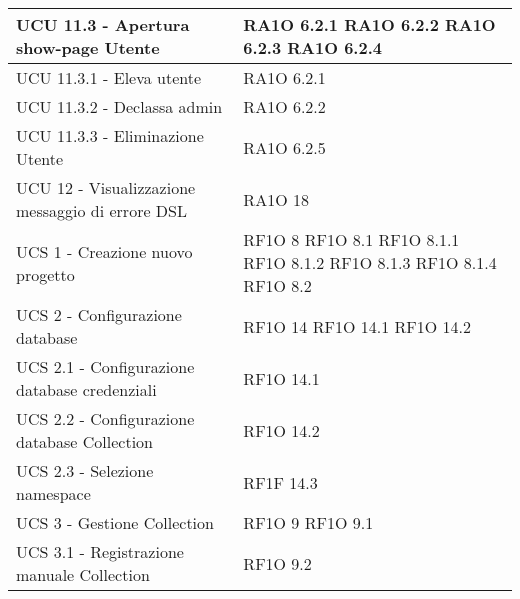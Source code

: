\begin{center}
\begin{longtable}{ | p{5cm} | p{5cm} |}
            UCU 11.3 - Apertura show-page Utente &  RA1O 6.2.1 \newline  RA1O 6.2.2 \newline  RA1O 6.2.3 \newline  RA1O 6.2.4 \newline  \\ \hline      
            UCU 11.3.1 - Eleva utente &  RA1O 6.2.1 \newline  \\ \hline      
            UCU 11.3.2 - Declassa admin &  RA1O 6.2.2 \newline  \\ \hline      
            UCU 11.3.3 - Eliminazione Utente &  RA1O 6.2.5 \newline  \\ \hline      
            UCU 12 - Visualizzazione messaggio di errore DSL &  RA1O 18 \newline  \\ \hline      
            UCS 1 - Creazione nuovo progetto &  RF1O 8 \newline  RF1O 8.1  \newline  RF1O 8.1.1 \newline  RF1O 8.1.2 \newline  RF1O 8.1.3 \newline  RF1O 8.1.4 \newline  RF1O 8.2 \newline  \\ \hline      
            UCS 2 - Configurazione database &  RF1O 14 \newline  RF1O 14.1 \newline  RF1O 14.2 \newline  \\ \hline      
            UCS 2.1  - Configurazione database credenziali &  RF1O 14.1 \newline  \\ \hline      
            UCS 2.2  - Configurazione database Collection &  RF1O 14.2 \newline  \\ \hline      
            UCS 2.3  - Selezione namespace &  RF1F 14.3 \newline  \\ \hline      
            UCS 3 - Gestione Collection &  RF1O 9 \newline  RF1O 9.1 \newline  \\ \hline      
            UCS 3.1  - Registrazione manuale Collection &  RF1O 9.2 \newline  \\ \hline      

\end{longtable}
\end{center}
